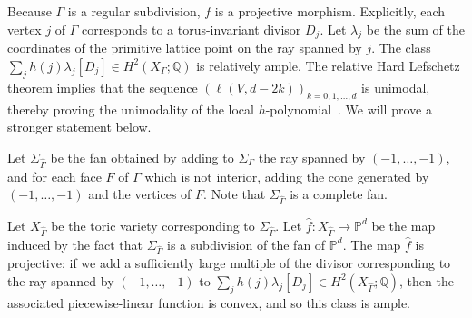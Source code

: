 Because $\Gamma$ is a regular subdivision, $f$ is a projective morphism. Explicitly, each vertex $j$ of $\Gamma$ corresponds to a torus-invariant divisor $D_j$. Let $\lambda_j$ be the sum of the coordinates of the primitive lattice point on the ray spanned by $j$. The class $\sum_j h(j) \lambda_j [D_j] \in H^2(X_{\Gamma}; \mathbb{Q})$ is relatively ample. 
The relative Hard Lefschetz theorem implies that the sequence $(\ell(V, d - 2k))_{k=0, 1, \dotsc, d}$ is unimodal, thereby proving the unimodality of the local $h$-polynomial~\cite[Theorem~5.2]{Stanleylocalh}. We will prove a stronger statement below. 

Let $\Sigma_{\hat{\Gamma}}$ be the fan obtained by adding to $\Sigma_{\Gamma}$ the ray spanned by $(-1, \dotsc, -1)$, and for each face $F$ of $\Gamma$ which is not interior, adding the cone generated by $(-1, \dotsc, -1)$ and the vertices of $F$. Note that $\Sigma_{\hat{\Gamma}}$ is a complete fan. 

Let $X_{\hat{\Gamma}}$ be the toric variety corresponding to $\Sigma_{\hat{\Gamma}}$. Let $\hat{f} \colon X_{\hat{\Gamma}} \to \mathbb{P}^d$ be the map induced by the fact that $\Sigma_{\hat{\Gamma}}$ is a subdivision of the fan of $\mathbb{P}^d$. The map $\hat{f}$ is projective: if we add a sufficiently large multiple of the divisor corresponding to the ray spanned by $(-1, \dotsc, -1)$ to $\sum_j h(j) \lambda_j [D_j] \in H^2(X_{\hat{\Gamma}}; \mathbb{Q})$, then the associated piecewise-linear function is convex, and so this class is ample. 



